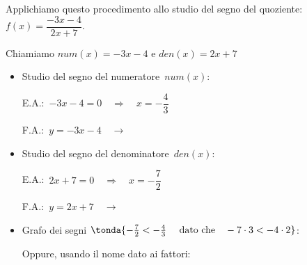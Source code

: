 \begin{esempio}{}{}
Applichiamo questo procedimento allo studio del segno del quoziente: \\
\(f(x)=\dfrac{-3x-4}{2x+7}\).

Chiamiamo \(num(x)=-3x-4\) \quad e \quad \(den(x)=2x+7\)

\begin{itemize} [noitemsep]
 \item Studio del segno del numeratore~\(num(x)\):\\
 \begin{minipage}{.45\textwidth}
  E.A.:~\(-3x-4 = 0 \quad \Rightarrow \quad x = -\dfrac{4}{3}\)
 \end{minipage}
 \begin{minipage}{.25\textwidth}
  F.A.:~\(y = -3x-4 \quad \rightarrow\)
 \end{minipage}
 \begin{minipage}{.3\textwidth}
 \end{minipage}
 \item Studio del segno del denominatore~\(den(x)\):\\
 \begin{minipage}{.45\textwidth}
  E.A.:~\(2x+7 = 0 \quad \Rightarrow \quad x=-\dfrac{7}{2}\)
 \end{minipage}
 \begin{minipage}{.25\textwidth}
  F.A.:~\(y = 2x+7 \quad \rightarrow\)
 \end{minipage}
 \begin{minipage}{.3\textwidth}
 \end{minipage}
 \item Grafo dei segni \(\tonda{-\frac{7}{2} < -\frac{4}{3}\quad 
 \text{ dato che} \quad -7 \cdot 3 < -4 \cdot 2}\):
 
 \segnoquozientea
 
 Oppure, usando il nome dato ai fattori: 
 

\end{itemize}
\end{esempio}
